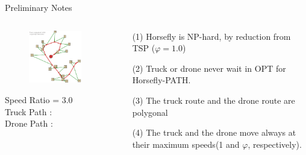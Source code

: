 \documentclass{beamer}
\begin{document}
\begin{frame}{Preliminary Notes}
    \begin{columns}
    \begin{column}{0.5\textwidth}
      \vspace{-19pt}
    \begin{figure}
      \includegraphics[width=6cm]{slide_imgs/horsefly_demo_output.jpg}
    \end{figure}

    
    {\small
      \vspace{-15pt}
      \hspace{40pt} Speed Ratio \varphi = 3.0 \\
      \hspace{40pt} Truck Path :   \\
      \hspace{40pt} Drone Path :   \\
     } 
    \end{column}

   \begin{column}{0.5\textwidth}
      \begin{itemize}
       \item[(1)] Horsefly is {\color{red} NP-hard}, by reduction from TSP ($\varphi = 1.0$)
       \item[(2)] Truck or drone {\color{red} never wait} in OPT for Horsefly-PATH. 
       \item[(3)] The truck route and the drone route are {\color{red} polygonal}
       \item[(4)] The truck and the drone move always at their {\color{red} maximum speeds}(1 and $\varphi$, respectively).
      \end{itemize}
    \end{column}
    
  \end{columns}
       
\end{frame}
\end{document}
